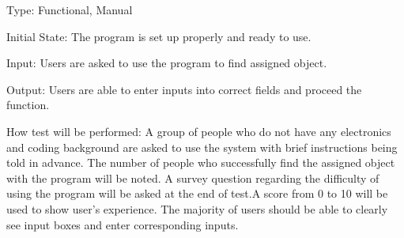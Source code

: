 \documentclass[12pt, titlepage]{article}
\begin{document}
\begin{enumerate}
Type: Functional, Manual
					
Initial State: The program is set up properly and ready to use.
					
Input: Users are asked to use the program to find assigned object.
					
Output: Users are able to enter inputs into correct fields and proceed the function.
					
How test will be performed: A group of people who do not have any electronics and coding background are asked to use the system with brief instructions being told in advance. The number of people who successfully find the assigned object with the program will be noted. A survey question regarding the difficulty of using the program will be asked at the end of test.A score from 0 to 10 will be used to show user's experience. The majority of users should be able to clearly see input boxes and enter corresponding inputs.


\end{enumerate}
\end{document}
